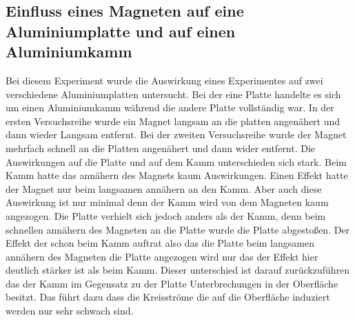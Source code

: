 \subsection{Einfluss eines Magneten auf eine Aluminiumplatte und auf einen Aluminiumkamm }
Bei diesem Experiment wurde die Auswirkung eines Experimentes auf zwei verschiedene Aluminiumplatten 
untersucht. Bei der eine Platte handelte es sich um einen Aluminiumkamm während die andere Platte vollständig war.
In der ersten Versuchsreihe wurde ein Magnet langsam an die platten angenähert und dann wieder Langsam entfernt.
Bei der zweiten Versuchsreihe wurde der Magnet mehrfach schnell an die Platten angenähert und dann wider entfernt.
Die Auswirkungen auf die Platte und auf dem Kamm unterschieden sich stark.
Beim Kamm hatte das annähern des Magnets kaum Auswirkungen. 
Einen Effekt hatte der Magnet nur beim langsamen annähern an den Kamm. Aber auch diese Auswirkung ist nur minimal denn der Kamm wird von dem Magneten kaum angezogen.
Die Platte verhielt sich jedoch anders als der Kamm, denn beim schnellen annähern des Magneten an die Platte wurde die Platte abgestoßen.
Der Effekt der schon beim Kamm auftrat also das die Platte beim langsamen annähern des Magneten die Platte angezogen wird nur das der Effekt hier deutlich stärker ist als beim Kamm.
Dieser unterschied ist darauf zurückzuführen das der Kamm im Gegensatz zu der Platte Unterbrechungen in der Oberfläche besitzt. Das führt dazu dass die Kreisströme die auf die Oberfläche induziert werden nur sehr schwach sind.

